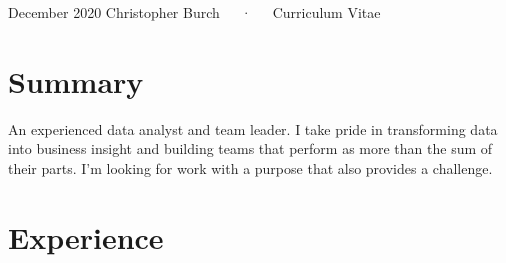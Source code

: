 \documentclass[11pt, a4paper]{awesome-cv}
\begin{document}
\makecvheader

\makecvfooter
  {December 2020}
    {Christopher Burch~~~·~~~Curriculum Vitae}
  {\thepage}





\hypertarget{summary}{%
\section{Summary}\label{summary}}

An experienced data analyst and team leader. I take pride in
transforming data into business insight and building teams that perform
as more than the sum of their parts. I'm looking for work with a purpose
that also provides a challenge.

\hypertarget{experience}{%
\section{Experience}\label{experience}}
\end{document}
